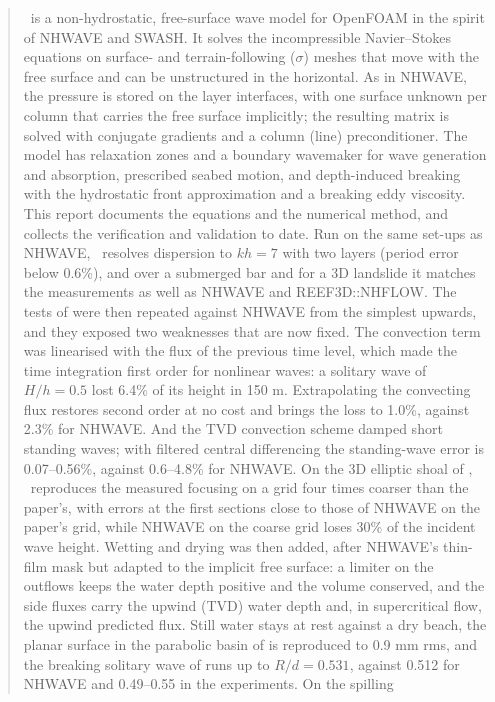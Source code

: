 \begin{abstract}
\NHFOAM\ is a non-hydrostatic, free-surface wave model for OpenFOAM in the
spirit of NHWAVE and SWASH. It solves the incompressible Navier--Stokes
equations on surface- and terrain-following ($\sigma$) meshes that move with the
free surface and can be unstructured in the horizontal. As in NHWAVE, the
pressure is stored on the layer interfaces, with one surface unknown per
column that carries the free surface implicitly; the resulting matrix is
solved with conjugate gradients and a column (line) preconditioner. The model
has relaxation zones and a boundary wavemaker for wave generation and absorption, prescribed seabed
motion, and depth-induced breaking with the hydrostatic front approximation
and a breaking eddy viscosity.
This report documents the equations and the numerical method, and collects
the verification and validation to date. Run on the same set-ups as NHWAVE,
\NHFOAM\ resolves dispersion to $kh = 7$ with two layers (period error below
0.6\%), and over a submerged bar and for a 3D landslide it matches the
measurements as well as NHWAVE and REEF3D::NHFLOW. The tests of
\citet{ma2012} were then repeated against NHWAVE from the simplest upwards,
and they exposed two weaknesses that are now fixed. The convection term was
linearised with the flux of the previous time level, which made the time
integration first order for nonlinear waves: a solitary wave of $H/h = 0.5$
lost 6.4\% of its height in 150 m. Extrapolating the convecting flux restores
second order at no cost and brings the loss to 1.0\%, against 2.3\% for NHWAVE.
And the TVD convection scheme damped short standing waves; with filtered
central differencing the standing-wave error is 0.07--0.56\%, against
0.6--4.8\% for NHWAVE. On the 3D elliptic shoal of \citet{berkhoff1982},
\NHFOAM\ reproduces the measured focusing on a grid four times coarser than
the paper's, with errors at the first sections close to those of NHWAVE on
the paper's grid, while NHWAVE on the coarse grid loses 30\% of the incident
wave height. Wetting and drying was then added, after NHWAVE's thin-film mask
but adapted to the implicit free surface: a limiter on the outflows keeps the
water depth positive and the volume conserved, and the side fluxes carry the
upwind (TVD) water depth and, in supercritical flow, the upwind predicted
flux. Still water stays at rest against a dry beach, the planar surface in
the parabolic basin of \citet{thacker1981} is reproduced to 0.9 mm rms, and
the breaking solitary wave of \citet{synolakis1987} runs up to $R/d = 0.531$,
against 0.512 for NHWAVE and 0.49--0.55 in the experiments. On the spilling

\end{abstract}
